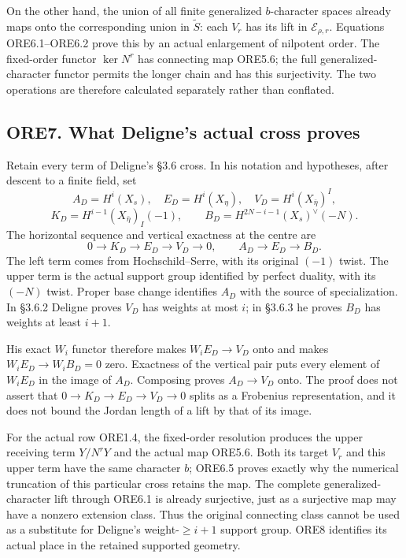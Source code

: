 On the other hand, the union of all finite generalized \(b\)-character
spaces already maps onto the corresponding union in \(\widetilde S\):
each \(V_r\) has its lift in \(\mathcal E_{\rho,r}\). Equations
ORE6.1--ORE6.2 prove this by an actual enlargement of nilpotent order.
The fixed-order functor \(\ker N^r\) has connecting map ORE5.6; the full
generalized-character functor permits the longer chain and has this
surjectivity. The two operations are therefore calculated separately
rather than conflated.

\subsection{ORE7. What Deligne's actual cross
proves}\label{ore7.-what-delignes-actual-cross-proves}

Retain every term of Deligne's §3.6 cross. In his notation and
hypotheses, after descent to a finite field, set \[
A_D=H^i(X_s),\quad E_D=H^i(X_\eta),\quad
V_D=H^i(X_{\bar\eta})^I,
\] \[
K_D=H^{i-1}(X_{\bar\eta})_I(-1),\qquad
B_D=H^{2N-i-1}(X_s)^\vee(-N).
\tag{ORE7.1}
\] The horizontal sequence and vertical exactness at the centre are \[
0\to K_D\to E_D\to V_D\to0,\qquad
A_D\to E_D\to B_D.
\tag{ORE7.2}
\] The left term comes from Hochschild--Serre, with its original
\((-1)\) twist. The upper term is the actual support group identified by
perfect duality, with its \((-N)\) twist. Proper base change identifies
\(A_D\) with the source of specialization. In §3.6.2 Deligne proves
\(V_D\) has weights at most \(i\); in §3.6.3 he proves \(B_D\) has
weights at least \(i+1\).

His exact \(W_i\) functor therefore makes \(W_iE_D\to V_D\) onto and
makes \(W_iE_D\to W_iB_D=0\) zero. Exactness of the vertical pair puts
every element of \(W_iE_D\) in the image of \(A_D\). Composing proves
\(A_D\to V_D\) onto. The proof does not assert that
\(0\to K_D\to E_D\to V_D\to0\) splits as a Frobenius representation, and
it does not bound the Jordan length of a lift by that of its image.

For the actual row ORE1.4, the fixed-order resolution produces the upper
receiving term \(Y/N^rY\) and the actual map ORE5.6. Both its target
\(V_r\) and this upper term have the same character \(b\); ORE6.5 proves
exactly why the numerical truncation of this particular cross retains
the map. The complete generalized-character lift through ORE6.1 is
already surjective, just as a surjective map may have a nonzero
extension class. Thus the original connecting class cannot be used as a
substitute for Deligne's weight-\(\ge i+1\) support group. ORE8
identifies its actual place in the retained supported geometry.

